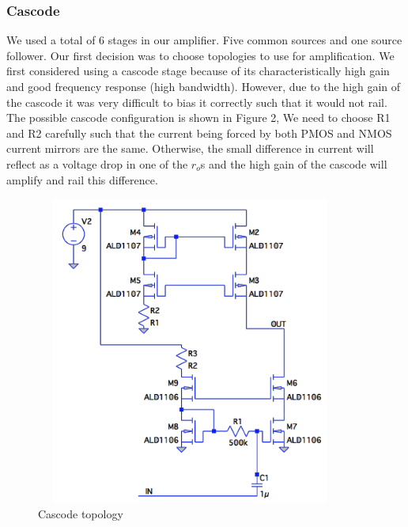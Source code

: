 \documentclass[11pt, twoside, letterpaper]{article}
\begin{document}
\subsubsection{Cascode}
We used a total of 6 stages in our amplifier. Five common sources and one source follower.
Our first decision was to choose topologies to use for amplification. We first considered using a cascode stage because of 
its characteristically high gain and good frequency response (high bandwidth). However, due to the high gain of the cascode
it was very difficult to bias it correctly such that it would not rail. The possible cascode configuration is shown in Figure 2,
We need to choose R1 and R2 carefully such that the current being forced by both PMOS and NMOS current mirrors are the same.
Otherwise, the small difference in current will reflect as a voltage drop in one of the $r_o$s and the high gain of the cascode
will amplify and rail this difference.

\begin{figure}[htbp]
\begin{center}
\includegraphics[width=4in,height=4in]{Cascode.png}
\caption{Cascode topology}
\end{center}
\end{figure}
\FloatBarrier
\end{document}
